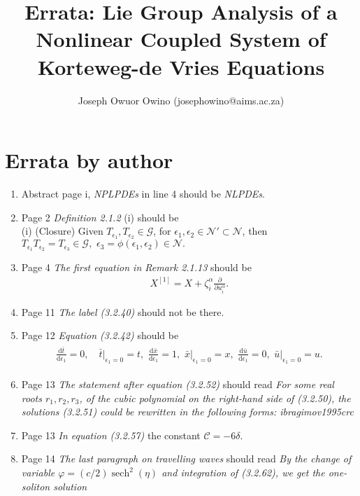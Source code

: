 \documentclass[11pt]{article}
\title{Errata: Lie Group Analysis of a Nonlinear  Coupled System of  Korteweg-de Vries Equations}
\author{Joseph Owuor Owino (josephowino@aims.ac.za)}
\date{}
\DeclareMathOperator{\sech}{sech}
\begin{document}
\maketitle
\section{Errata by author}
\begin{enumerate}
 \item Abstract page i, \textit{NPLPDEs} in line 4 should be \textit{NLPDEs}.
 \item Page 2 \textit{Definition 2.1.2} (i) should be \\
 (i) (Closure) Given \label{propty1} $T_{\epsilon_1},T_{\epsilon_2}  \in \mathcal{G}$, for $\epsilon_1,\epsilon_2 \in  \mathcal{N}' \subset \mathcal{N} $, then $T_{\epsilon_1}T_{\epsilon_2} = T_{\epsilon_3} \in \mathcal{G},\,\,  \epsilon_3= \phi( \epsilon_1,\epsilon_2) \in \mathcal{N}.$
 \item Page 4 \textit{The first equation in Remark 2.1.13} should be 	\begin{align} 
 X^{[1]} = X + \zeta_i^{\alpha} \frac{ \partial }{ \partial u_i^{\alpha}}.\end{align}
 \item Page 11 \textit{The label (3.2.40)} should not be there.
\item Page 12 \textit{Equation (3.2.42)}  should be \begin{align} \begin{aligned}
\frac{\mathrm{d} \bar{t} }{ \mathrm{d} \epsilon_1 } = 0,\quad \bar{t}\Big |_{ \epsilon_1 =0} =t, \,\,
\frac{ \mathrm{d} \bar{x}}{ \mathrm{d}\epsilon_1} =1,\,\, \bar{x}\Big |_{ \epsilon_1 =0} =x, \,\,
\frac{ \mathrm{d} \bar{u}}{ \mathrm{d}\epsilon_1} = 0,\,\, \bar{u}\Big |_{ \epsilon_1 =0} =u.
\label{lieeq3} \end{aligned}
\end{align}
\item Page 13 \textit{The statement after equation (3.2.52)} should read \textit{ For some real roots $r_1, r_2 ,r_3$, of the cubic polynomial on the right-hand side of (3.2.50), the solutions (3.2.51) could be rewritten in the following forms: {ibragimov1995crc} }
\item Page 13 \textit{In equation (3.2.57)} the constant $ \mathcal{C}=-6\delta$.
\item Page 14 \textit{The last paragraph on travelling waves} should read \textit{By the change of variable \newline$ \varphi =({c}/{2}) \sech^2( \eta)$ and integration of (3.2.62), we get the one-soliton solution 
}
\end{enumerate}
\end{document}

